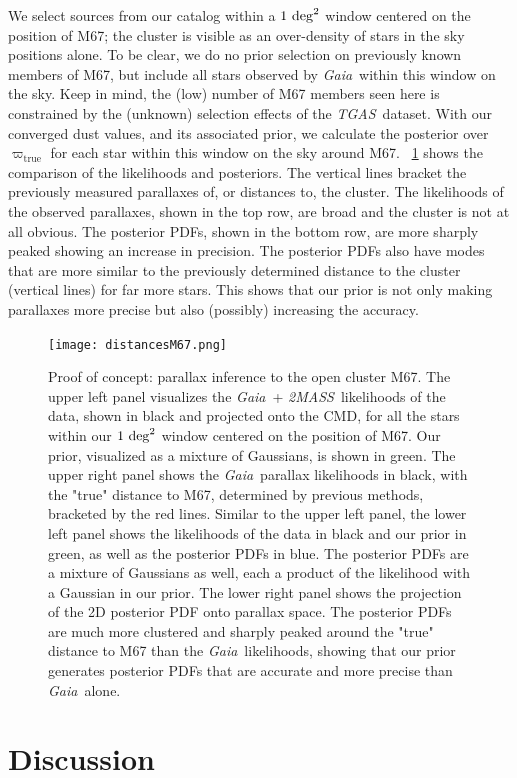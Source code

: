 \documentclass[modern]{aastex61}
\newcommand{\acronym}[1]{{\small{#1}}}
\newcommand{\project}[1]{\textsl{#1}}
\newcommand{\tgas}{\project{\acronym{TGAS}}}
\newcommand{\tmass}{\project{\acronym{2MASS}}}
\newcommand{\gaia}{\project{Gaia}}
\newcommand{\cmd}{\acronym{CMD}}
\newcommand{\true}{\mathrm{true}}
\begin{document}
We select sources from our catalog within a $1~{\rm deg}^2$ window centered on the position of M67; the cluster is visible as an over-density of stars in the sky positions alone.
To be clear, we do no prior selection on previously known members of M67, but include all stars observed by \gaia\ within this window on the sky.
Keep in mind, the (low) number of M67 members seen here is constrained by the (unknown) selection effects of the \tgas\ dataset.
With our converged dust values, and its associated prior, we calculate the posterior over $\varpi_{\true}$ for each star within this window on the sky around M67.
\figurename~\ref{fig:m67} shows the comparison of the likelihoods and posteriors.
The vertical lines bracket the previously measured parallaxes of, or distances to, the cluster.
The likelihoods of the observed parallaxes, shown in the top row, are broad and the cluster is not at all obvious.
The posterior PDFs, shown in the bottom row, are more sharply peaked showing an increase in precision.
The posterior PDFs also have modes that are more similar to the previously determined distance to the cluster (vertical lines) for far more stars.
This shows that our prior is not only making parallaxes more precise but also (possibly) increasing the accuracy.
\begin{figure}
\centering
  \texttt{[image: distancesM67.png]}
\caption{Proof of concept: parallax inference to the open cluster M67.
The upper left panel visualizes the \gaia\ + \tmass\ likelihoods of the data, shown in black and projected onto the \cmd, for all the stars within our $1~{\rm deg}^2$ window centered on the position of M67.
Our prior, visualized as a mixture of Gaussians, is shown in green.
The upper right panel shows the \gaia\ parallax likelihoods in black, with the "true" distance to M67, determined by previous methods, bracketed by the red lines.
Similar to the upper left panel, the lower left panel shows the likelihoods of the data in black and our prior in green, as well as the posterior PDFs in blue.
The posterior PDFs are a mixture of Gaussians as well, each a product of the likelihood with a Gaussian in our prior.
The lower right panel shows the projection of the 2D posterior PDF onto parallax space.
The posterior PDFs are much more clustered and sharply peaked around the "true" distance to M67 than the \gaia\ likelihoods, showing that our prior generates posterior PDFs that are accurate and more precise than \gaia\ alone.}
\label{fig:m67}
\end{figure}


\section{Discussion}
\end{document}
